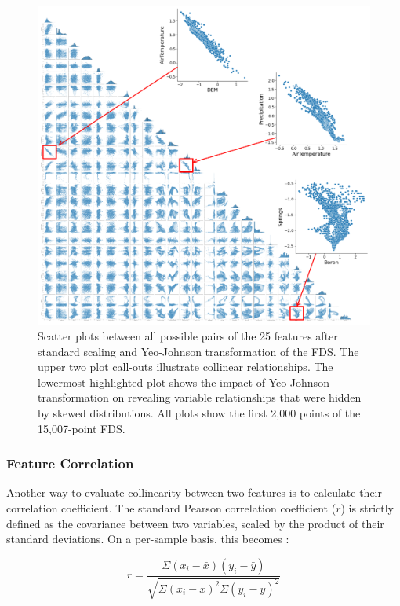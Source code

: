 \begin{figure}[!htp]
\centering
\includegraphics[width=\textwidth]{templates/images/Figure-Scatterplot_Scaled_Features.png}
\caption[Scaled FDS scatter plots]{Scatter plots between all possible pairs of the 25 features after standard scaling and Yeo-Johnson transformation of the FDS. The upper two plot call-outs illustrate collinear relationships. The lowermost highlighted plot shows the impact of Yeo-Johnson transformation on revealing variable relationships that were hidden by skewed distributions. All plots show the first 2,000 points of the 15,007-point FDS.}
\label{fig:scaled_scatter}
\end{figure}

\subsubsection{Feature Correlation}\label{ch3:feat_corr}
Another way to evaluate collinearity between two features is to calculate their correlation coefficient. The standard Pearson correlation coefficient ($r$) is strictly defined as the covariance between two variables, scaled by the product of their standard deviations. On a per-sample basis, this becomes \citep[p.\ 70]{james_introduction_2013}:

\begin{equation}
    r = \frac{\Sigma(x_i-\bar{x})(y_i-\bar{y})}{\sqrt{\Sigma{(x_i-\bar{x})^2} \Sigma{(y_i-\bar{y})^2}}}
\end{equation}

